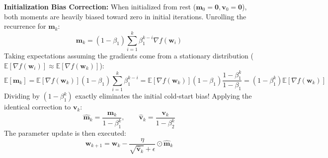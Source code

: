 \textbf{Initialization Bias Correction:} When initialized from rest ($\mathbf{m}_0 = \mathbf{0}, \mathbf{v}_0 = \mathbf{0}$), both moments are heavily biased toward zero in initial iterations.
Unrolling the recurrence for $\mathbf{m}_k$:
\begin{equation}
\mathbf{m}_k = (1 - \beta_1) \sum_{i=1}^k \beta_1^{k-i} \nabla f(\mathbf{w}_i)
\end{equation}
Taking expectations assuming the gradients come from a stationary distribution ($\mathbb{E}[\nabla f(\mathbf{w}_i)] \approx \mathbb{E}[\nabla f(\mathbf{w}_k)]$):
\begin{equation}
\mathbb{E}[\mathbf{m}_k] = \mathbb{E}[\nabla f(\mathbf{w}_k)] (1 - \beta_1) \sum_{i=1}^k \beta_1^{k-i} = \mathbb{E}[\nabla f(\mathbf{w}_k)] (1 - \beta_1) \frac{1 - \beta_1^k}{1 - \beta_1} = (1 - \beta_1^k) \mathbb{E}[\nabla f(\mathbf{w}_k)]
\end{equation}
Dividing by $(1 - \beta_1^k)$ exactly eliminates the initial cold-start bias! Applying the identical correction to $\mathbf{v}_k$:
\begin{equation}
\hat{\mathbf{m}}_k = \frac{\mathbf{m}_k}{1 - \beta_1^k}, \qquad \hat{\mathbf{v}}_k = \frac{\mathbf{v}_k}{1 - \beta_2^k}
\label{eq:adam_bias_correction}
\end{equation}
The parameter update is then executed:
\begin{equation}
\mathbf{w}_{k+1} = \mathbf{w}_k - \frac{\eta}{\sqrt{\hat{\mathbf{v}}_k} + \epsilon} \odot \hat{\mathbf{m}}_k
\label{eq:adam_update}
\end{equation}

